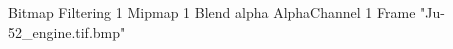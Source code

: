 {Bitmap
	{Filtering 1}
	{Mipmap 1}
	{Blend alpha}
	{AlphaChannel 1}
	{Frame "Ju-52_engine.tif.bmp"}
}
